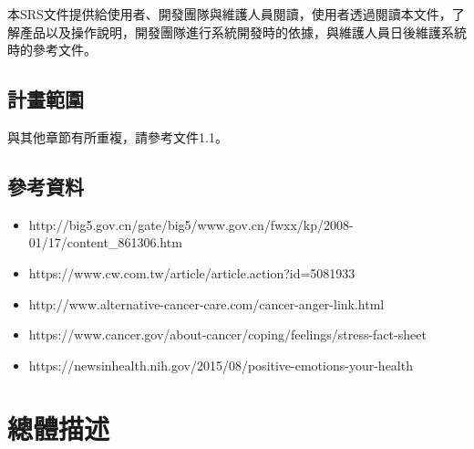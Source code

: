 \documentclass[12pt]{scrreprt}
\begin{document}
本SRS文件提供給使用者、開發團隊與維護人員閱讀，使用者透過閱讀本文件，了解產品以及操作說明，開發團隊進行系統開發時的依據，與維護人員日後維護系統時的參考文件。

\section{計畫範圍}
與其他章節有所重複，請參考文件1.1。


\section{參考資料}
\begin{itemize}
\item{http://big5.gov.cn/gate/big5/www.gov.cn/fwxx/kp/2008-01/17/content_861306.htm}

\item{https://www.cw.com.tw/article/article.action?id=5081933}

\item{http://www.alternative-cancer-care.com/cancer-anger-link.html}

\item{https://www.cancer.gov/about-cancer/coping/feelings/stress-fact-sheet}

\item{https://newsinhealth.nih.gov/2015/08/positive-emotions-your-health}
\end{itemize}


\chapter{總體描述}
\end{document}
